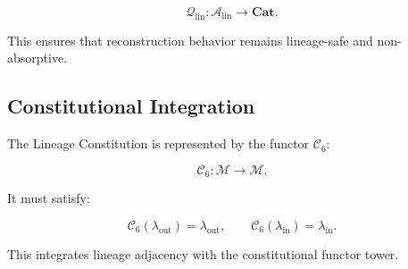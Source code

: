 \[
\mathcal{Q}_{\mathrm{lin}} :
\mathcal{A}_{\mathrm{lin}} \to \mathbf{Cat}.
\]

This ensures that reconstruction behavior remains lineage-safe and
non-absorptive.


\subsection{Constitutional Integration}

The Lineage Constitution is represented by the functor $\mathcal{C}_6$:

\[
\mathcal{C}_6 : \mathcal{M} \to \mathcal{M}.
\]

It must satisfy:

\[
\mathcal{C}_6(\lambda_{\mathrm{out}}) = \lambda_{\mathrm{out}}, \qquad
\mathcal{C}_6(\lambda_{\mathrm{in}})  = \lambda_{\mathrm{in}}.
\]

This integrates lineage adjacency with the constitutional functor tower.

